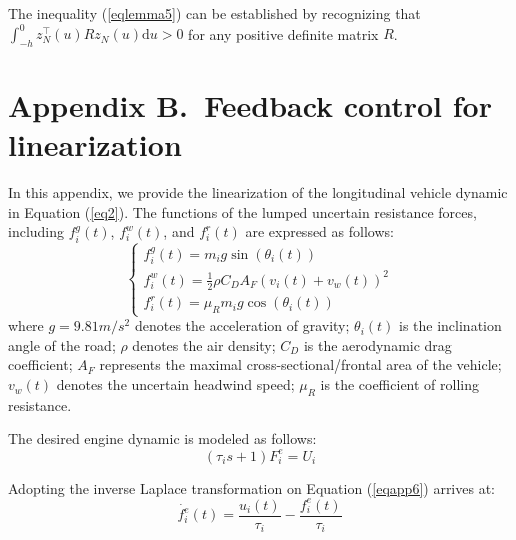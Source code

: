 \documentclass[a4paper]{cas-sc}
\begin{document}
The inequality (\ref{eqlemma5}) can be established by recognizing that $\int_{ - h}^0 {z_N^ \top } (u)R{z_N}(u){\text{d}}u > 0$ for any positive definite matrix $R$.



\section*{Appendix B.~Feedback control for linearization}
\label{AppendixB}
In this appendix, we provide the linearization of the longitudinal vehicle dynamic in Equation (\ref{eq2}). The functions of the lumped uncertain resistance forces, including $f_i^g(t)$, $f_i^w(t)$, and $f_i^r(t)$ are expressed as follows:
\begin{equation}
  \left\{\begin{array}{l}
    f_{i}^{g}(t)=m_{i} g \sin \left(\theta_{i}(t)\right)                        \\
    f_{i}^{w}(t)=\frac{1}{2} \rho C_{D} A_{F}\left(v_{i}(t)+v_{w}(t)\right)^{2} \\
    f_{i}^{r}(t)=\mu_{R} m_{i} g \cos \left(\theta_{i}(t)\right)
  \end{array}\right.
  \label{eqapp5}
\end{equation}
where $g=9.81m/s^2$ denotes the acceleration of gravity; $\theta_i(t)$ is the inclination angle of the road; $\rho$ denotes the air density; $C_D$ is the aerodynamic drag coefficient; $A_F$ represents the maximal cross-sectional/frontal area of the vehicle; $v_w(t)$ denotes the uncertain headwind speed; $\mu_R$ is the coefficient of rolling resistance.

The desired engine dynamic is modeled as follows:
\begin{equation}
  (\tau_is+1)F_i^e=U_i
  \label{eqapp6}
\end{equation}

Adopting the inverse Laplace transformation on Equation (\ref{eqapp6}) arrives at:
\begin{equation}
  \dot{f_i^e}\left(t\right)=\frac{u_i(t)}{\tau_i}-\frac{f_i^e\left(t\right)}{\tau_i}
  \label{eqapp7}
\end{equation}
\end{document}
